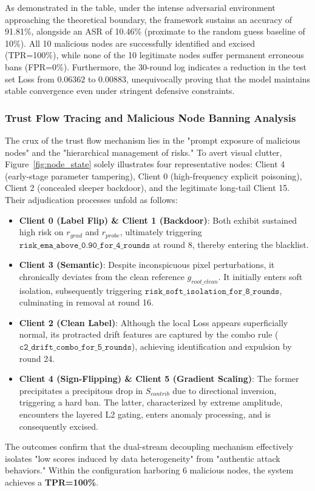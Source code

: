 \documentclass[final,5p,times,twocolumn]{elsarticle/elsarticle}
\begin{document}
As demonstrated in the table, under the intense adversarial environment approaching the theoretical boundary, the framework sustains an accuracy of 91.81\%, alongside an ASR of 10.46\% (proximate to the random guess baseline of 10\%). All 10 malicious nodes are successfully identified and excised (TPR=100\%), while none of the 10 legitimate nodes suffer permanent erroneous bans (FPR=0\%). Furthermore, the 30-round log indicates a reduction in the test set Loss from $0.06362$ to $0.00883$, unequivocally proving that the model maintains stable convergence even under stringent defensive constraints.

\subsubsection{Trust Flow Tracing and Malicious Node Banning Analysis}
The crux of the trust flow mechanism lies in the "prompt exposure of malicious nodes" and the "hierarchical management of risks." To avert visual clutter, Figure~\ref{fig:node_state} solely illustrates four representative nodes: Client 4 (early-stage parameter tampering), Client 0 (high-frequency explicit poisoning), Client 2 (concealed sleeper backdoor), and the legitimate long-tail Client 15. Their adjudication processes unfold as follows:
\begin{itemize}
    \item \textbf{Client 0 (Label Flip) \& Client 1 (Backdoor)}: Both exhibit sustained high risk on $r_{grad}$ and $r_{probe}$, ultimately triggering $\texttt{risk\_ema\_above\_0.90\_for\_4\_rounds}$ at round 8, thereby entering the blacklist.
    \item \textbf{Client 3 (Semantic)}: Despite inconspicuous pixel perturbations, it chronically deviates from the clean reference $g_{root\_clean}$. It initially enters soft isolation, subsequently triggering $\texttt{risk\_soft\_isolation\_for\_8\_rounds}$, culminating in removal at round 16.
    \item \textbf{Client 2 (Clean Label)}: Although the local Loss appears superficially normal, its protracted drift features are captured by the combo rule ($\texttt{c2\_drift\_combo\_for\_5\_rounds}$), achieving identification and expulsion by round 24.
    \item \textbf{Client 4 (Sign-Flipping) \& Client 5 (Gradient Scaling)}: The former precipitates a precipitous drop in $S_{contrib}$ due to directional inversion, triggering a hard ban. The latter, characterized by extreme amplitude, encounters the layered L2 gating, enters anomaly processing, and is consequently excised.
\end{itemize}
The outcomes confirm that the dual-stream decoupling mechanism effectively isolates "low scores induced by data heterogeneity" from "authentic attack behaviors." Within the configuration harboring 6 malicious nodes, the system achieves a \textbf{TPR=100\%}.
\end{document}
